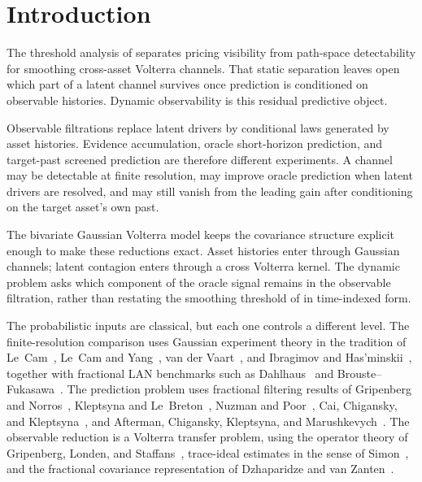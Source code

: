 \documentclass[11pt,a4paper]{amsart}
\theoremstyle{plain}
\theoremstyle{definition}
\theoremstyle{remark}
\begin{document}
\maketitle

\section{Introduction}\label{sec:intro}

The threshold analysis of \cite{vidal2026latent} separates pricing visibility from path-space
detectability for smoothing cross-asset Volterra channels.  That static separation leaves open
which part of a latent channel survives once prediction is conditioned on observable histories.
Dynamic observability is this residual predictive object.

Observable filtrations replace latent drivers by conditional laws generated by asset histories.
Evidence accumulation, oracle short-horizon prediction, and target-past screened prediction are
therefore different experiments.  A channel may be detectable at finite resolution, may improve
oracle prediction when latent drivers are resolved, and may still vanish from the leading gain after
conditioning on the target asset's own past.

The bivariate Gaussian Volterra model keeps the covariance structure explicit enough to make these
reductions exact.  Asset histories enter through Gaussian channels; latent contagion enters through
a cross Volterra kernel.  The dynamic problem asks which component of the oracle signal remains in
the observable filtration, rather than restating the smoothing threshold of \cite{vidal2026latent} in
time-indexed form.

The probabilistic inputs are classical, but each one controls a different level.  The
finite-resolution comparison uses Gaussian experiment theory in the tradition of
Le~Cam~\cite{LeCam86}, Le~Cam and Yang~\cite{LeCamYang00}, van der Vaart~\cite{vdV98}, and
Ibragimov and Has'minskii~\cite{IH81}, together with fractional LAN benchmarks such as
Dahlhaus~\cite{Dahl89} and Brouste--Fukasawa~\cite{BF18}.  The prediction problem uses fractional
filtering results of Gripenberg and Norros~\cite{GN96}, Kleptsyna and
Le~Breton~\cite{KLB02}, Nuzman and Poor~\cite{NP00}, Cai, Chigansky, and
Kleptsyna~\cite{CCK16}, and Afterman, Chigansky, Kleptsyna, and
Marushkevych~\cite{ACKM22}.  The observable reduction is a Volterra transfer problem, using the
operator theory of Gripenberg, Londen, and Staffans~\cite{GLS90}, trace-ideal estimates in the
sense of Simon~\cite{Sim05}, and the fractional covariance representation of Dzhaparidze and van
Zanten~\cite{DvZ05}.
\end{document}
